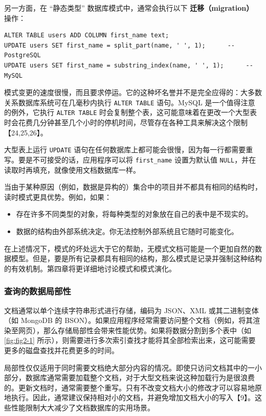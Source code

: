 另一方面，在 “静态类型” 数据库模式中，通常会执行以下 \textbf{迁移（migration）} 操作：

\begin{lstlisting}
ALTER TABLE users ADD COLUMN first_name text;
UPDATE users SET first_name = split_part(name, ' ', 1);      -- PostgreSQL
UPDATE users SET first_name = substring_index(name, ' ', 1);      -- MySQL
\end{lstlisting}

模式变更的速度很慢，而且要求停运。它的这种坏名誉并不是完全应得的：大多数关系数据库系统可在几毫秒内执行 \texttt{ALTER TABLE} 语句。MySQL 是一个值得注意的例外，它执行 \texttt{ALTER TABLE} 时会复制整个表，这可能意味着在更改一个大型表时会花费几分钟甚至几个小时的停机时间，尽管存在各种工具来解决这个限制【24,25,26】。

大型表上运行 \texttt{UPDATE} 语句在任何数据库上都可能会很慢，因为每一行都需要重写。要是不可接受的话，应用程序可以将 \texttt{first\_name} 设置为默认值 \texttt{NULL}，并在读取时再填充，就像使用文档数据库一样。

当由于某种原因（例如，数据是异构的）集合中的项目并不都具有相同的结构时，读时模式更具优势。例如，如果：

\begin{itemize}
    \item 存在许多不同类型的对象，将每种类型的对象放在自己的表中是不现实的。
    \item 数据的结构由外部系统决定。你无法控制外部系统且它随时可能变化。
\end{itemize}

在上述情况下，模式的坏处远大于它的帮助，无模式文档可能是一个更加自然的数据模型。但是，要是所有记录都具有相同的结构，那么模式是记录并强制这种结构的有效机制。第四章将更详细地讨论模式和模式演化。

\subsubsection{查询的数据局部性}

文档通常以单个连续字符串形式进行存储，编码为 JSON、XML 或其二进制变体（如 MongoDB 的 BSON）。如果应用程序经常需要访问整个文档（例如，将其渲染至网页），那么存储局部性会带来性能优势。如果将数据分割到多个表中（如 \autoref{fig:fig2-1} 所示），则需要进行多次索引查找才能将其全部检索出来，这可能需要更多的磁盘查找并花费更多的时间。

局部性仅仅适用于同时需要文档绝大部分内容的情况。即使只访问文档其中的一小部分，数据库通常需要加载整个文档，对于大型文档来说这种加载行为是很浪费的。更新文档时，通常需要整个重写。只有不改变文档大小的修改才可以容易地原地执行。因此，通常建议保持相对小的文档，并避免增加文档大小的写入【9】。这些性能限制大大减少了文档数据库的实用场景。

